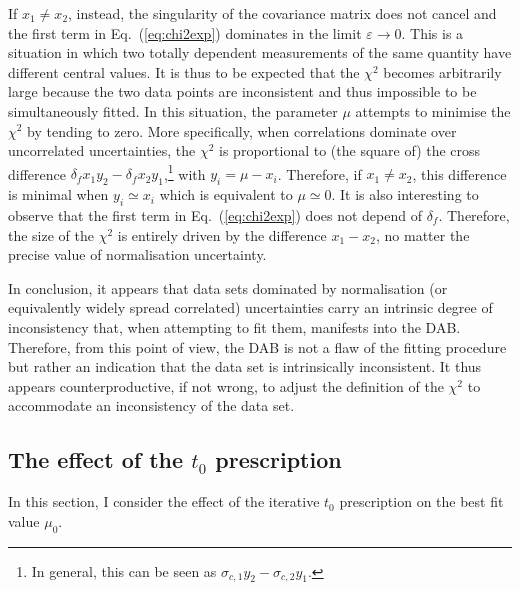 \documentclass[10pt,a4paper]{article}
\begin{document}
If $x_1\neq x_2$, instead, the singularity of the covariance matrix
does not cancel and the first term in Eq.~(\ref{eq:chi2exp}) dominates
in the limit $\varepsilon\rightarrow0$. This is a situation in which
two totally dependent measurements of the same quantity have different
central values. It is thus to be expected that the $\chi^2$ becomes
arbitrarily large because the two data points are inconsistent and
thus impossible to be simultaneously fitted. In this situation, the
parameter $\mu$ attempts to minimise the $\chi^2$ by tending to
zero. More specifically, when correlations dominate over uncorrelated
uncertainties, the $\chi^2$ is proportional to (the square of) the
cross difference $\delta_fx_1y_2-\delta_fx_2y_1$,\footnote{In general,
  this can be seen as $\sigma_{c,1}y_2-\sigma_{c,2}y_1$.}  with
$y_i = \mu - x_i$. Therefore, if $x_1\neq x_2$, this difference is
minimal when $y_i\simeq x_i$ which is equivalent to $\mu\simeq 0$. It
is also interesting to observe that the first term in
Eq.~(\ref{eq:chi2exp}) does not depend of $\delta_f$. Therefore, the
size of the $\chi^2$ is entirely driven by the difference $x_1-x_2$,
no matter the precise value of normalisation uncertainty.

In conclusion, it appears that data sets dominated by normalisation
(or equivalently widely spread correlated) uncertainties carry an
intrinsic degree of inconsistency that, when attempting to fit them,
manifests into the DAB. Therefore, from this point of view, the DAB is
not a flaw of the fitting procedure but rather an indication that the
data set is intrinsically inconsistent. It thus appears
counterproductive, if not wrong, to adjust the definition of the
$\chi^2$ to accommodate an inconsistency of the data set.

\subsection{The effect of the $t_0$ prescription}

In this section, I consider the effect of the iterative $t_0$
prescription on the best fit value $\mu_0$.
\end{document}
